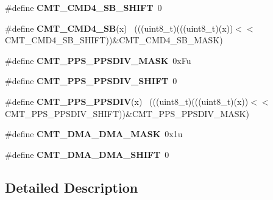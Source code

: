 \begin{DoxyCompactItemize}
\item 
\hypertarget{group___c_m_t___register___masks_gac4d14f573bc993ac68f7cc9242fbe888}{}\#define {\bfseries C\+M\+T\+\_\+\+C\+M\+D4\+\_\+\+S\+B\+\_\+\+S\+H\+I\+F\+T}~0\label{group___c_m_t___register___masks_gac4d14f573bc993ac68f7cc9242fbe888}

\item 
\hypertarget{group___c_m_t___register___masks_ga346b641d1b301aa99d317d8a98c62c97}{}\#define {\bfseries C\+M\+T\+\_\+\+C\+M\+D4\+\_\+\+S\+B}(x)                                                  ~(((uint8\+\_\+t)(((uint8\+\_\+t)(x))$<$$<$C\+M\+T\+\_\+\+C\+M\+D4\+\_\+\+S\+B\+\_\+\+S\+H\+I\+F\+T))\&C\+M\+T\+\_\+\+C\+M\+D4\+\_\+\+S\+B\+\_\+\+M\+A\+S\+K)\label{group___c_m_t___register___masks_ga346b641d1b301aa99d317d8a98c62c97}

\item 
\hypertarget{group___c_m_t___register___masks_ga52042920cc25a46d0e050801a105a629}{}\#define {\bfseries C\+M\+T\+\_\+\+P\+P\+S\+\_\+\+P\+P\+S\+D\+I\+V\+\_\+\+M\+A\+S\+K}~0x\+Fu\label{group___c_m_t___register___masks_ga52042920cc25a46d0e050801a105a629}

\item 
\hypertarget{group___c_m_t___register___masks_gaaafd6c1e8178ed7cd283f3ffcfaed535}{}\#define {\bfseries C\+M\+T\+\_\+\+P\+P\+S\+\_\+\+P\+P\+S\+D\+I\+V\+\_\+\+S\+H\+I\+F\+T}~0\label{group___c_m_t___register___masks_gaaafd6c1e8178ed7cd283f3ffcfaed535}

\item 
\hypertarget{group___c_m_t___register___masks_gab292c1e5177eff6589d66ee39bd5f5eb}{}\#define {\bfseries C\+M\+T\+\_\+\+P\+P\+S\+\_\+\+P\+P\+S\+D\+I\+V}(x)                                            ~(((uint8\+\_\+t)(((uint8\+\_\+t)(x))$<$$<$C\+M\+T\+\_\+\+P\+P\+S\+\_\+\+P\+P\+S\+D\+I\+V\+\_\+\+S\+H\+I\+F\+T))\&C\+M\+T\+\_\+\+P\+P\+S\+\_\+\+P\+P\+S\+D\+I\+V\+\_\+\+M\+A\+S\+K)\label{group___c_m_t___register___masks_gab292c1e5177eff6589d66ee39bd5f5eb}

\item 
\hypertarget{group___c_m_t___register___masks_ga65c04dcbc5d319c8f0532568570e555a}{}\#define {\bfseries C\+M\+T\+\_\+\+D\+M\+A\+\_\+\+D\+M\+A\+\_\+\+M\+A\+S\+K}~0x1u\label{group___c_m_t___register___masks_ga65c04dcbc5d319c8f0532568570e555a}

\item 
\hypertarget{group___c_m_t___register___masks_gaf60148184935a9ae825cecc482734b31}{}\#define {\bfseries C\+M\+T\+\_\+\+D\+M\+A\+\_\+\+D\+M\+A\+\_\+\+S\+H\+I\+F\+T}~0\label{group___c_m_t___register___masks_gaf60148184935a9ae825cecc482734b31}

\end{DoxyCompactItemize}


\subsection{Detailed Description}

